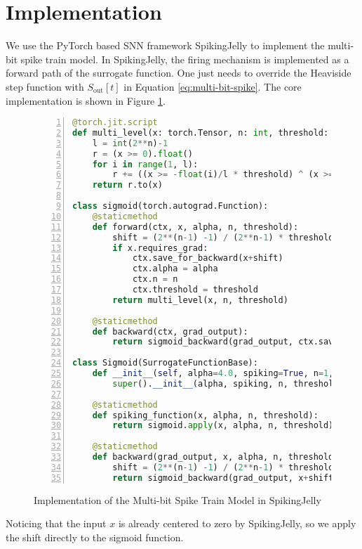 \section{Implementation}
\label{sec:implementation}

    We use the PyTorch based SNN framework SpikingJelly to implement the multi-bit spike train model. In SpikingJelly, the firing mechanism is implemented as a forward path of the surrogate function. One just needs to override the Heaviside step function with $S_{\text{out}}[t]$ in Equation \ref{eq:multi-bit-spike}. The core implementation is shown in Figure \ref{listing:multi-bit-spike}.
    \begin{figure}[!htpb]
        \centering
        \begin{lstlisting}[language=Python, basicstyle=\small, breaklines=true, numbers=left, stepnumber=1]
@torch.jit.script
def multi_level(x: torch.Tensor, n: int, threshold: float):
    l = int(2**n)-1
    r = (x >= 0).float()
    for i in range(1, l):
        r += ((x >= -float(i)/l * threshold) ^ (x >= -float(i-1)/l * threshold)) * float(l-i)/l
    return r.to(x)

class sigmoid(torch.autograd.Function):
    @staticmethod
    def forward(ctx, x, alpha, n, threshold):
        shift = (2**(n-1) -1) / (2**n-1) * threshold
        if x.requires_grad:
            ctx.save_for_backward(x+shift)
            ctx.alpha = alpha
            ctx.n = n
            ctx.threshold = threshold
        return multi_level(x, n, threshold)

    @staticmethod
    def backward(ctx, grad_output):
        return sigmoid_backward(grad_output, ctx.saved_tensors[0], ctx.alpha, ctx.n, ctx.threshold)

class Sigmoid(SurrogateFunctionBase):
    def __init__(self, alpha=4.0, spiking=True, n=1, threshold=1.0):
        super().__init__(alpha, spiking, n, threshold)

    @staticmethod
    def spiking_function(x, alpha, n, threshold):
        return sigmoid.apply(x, alpha, n, threshold)

    @staticmethod
    def backward(grad_output, x, alpha, n, threshold):
        shift = (2**(n-1) -1) / (2**n-1) * threshold
        return sigmoid_backward(grad_output, x+shift, alpha, n, threshold)[0]
        \end{lstlisting}
        \caption{Implementation of the Multi-bit Spike Train Model in SpikingJelly}
        \label{listing:multi-bit-spike}
    \end{figure}

    Noticing that the input $x$ is already centered to zero by SpikingJelly, so we apply the shift directly to the sigmoid function. 
